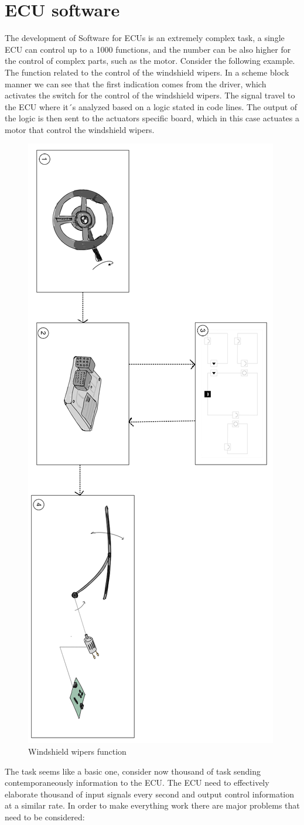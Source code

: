 \documentclass[../main.tex]{subfiles}
\begin{document}
\section{ECU software}
The development of Software for ECUs is an extremely complex task, a single ECU can control up to a 1000 functions, and the number can be also higher for the control of complex parts, such as the motor.
Consider the following example. The function related to the control of the windshield wipers. In a scheme block manner we can see that the first indication comes from the driver, which activates the switch for the control of the windshield wipers. The signal travel to the ECU where it´s analyzed based on a logic stated in code lines. The output of the logic is then sent to the actuators specific board, which in this case actuates a motor that control the windshield wipers.\\
\begin{figure}[H]
    \centering
    \includegraphics[width=0.45\linewidth, angle = 90]{images_folder/windshieldwipersfunction.jpeg}
    \caption{Windshield wipers function}
    \label{fig:WWFunct}
\end{figure}
The task seems like a basic one, consider now thousand of task sending contemporaneously information to the ECU. The ECU need to effectively elaborate thousand of input signals every second and output control information at a similar rate. In order to make everything work there are major problems that need to be considered:
\end{document}
